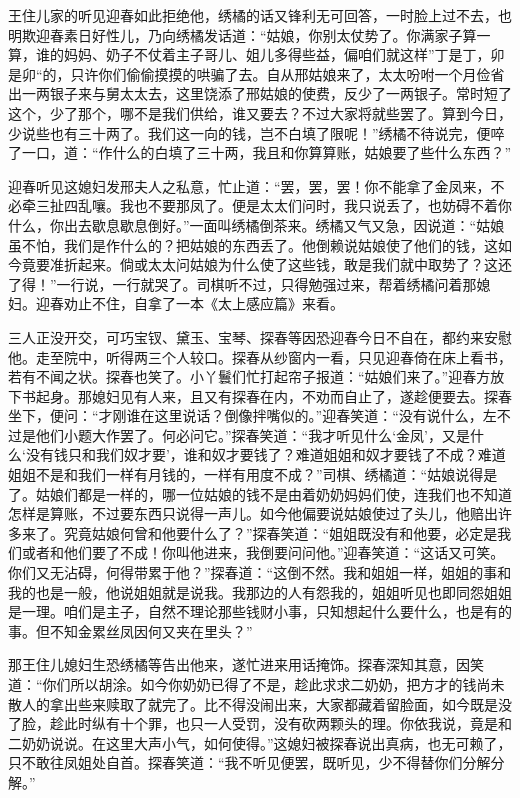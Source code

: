 \documentclass[12pt,oneside]{book}
\begin{document}
王住儿家的听见迎春如此拒绝他，绣橘的话又锋利无可回答，一时脸上过不去，也明欺迎春素日好性儿，乃向绣橘发话道：“姑娘，你别太仗势了。你满家子算一算，谁的妈妈、奶子不仗着主子哥儿、姐儿多得些益，偏咱们就这样”丁是丁，卯是卯“的，只许你们偷偷摸摸的哄骗了去。自从邢姑娘来了，太太吩咐一个月俭省出一两银子来与舅太太去，这里饶添了邢姑娘的使费，反少了一两银子。常时短了这个，少了那个，哪不是我们供给，谁又要去？不过大家将就些罢了。算到今日，少说些也有三十两了。我们这一向的钱，岂不白填了限呢！”绣橘不待说完，便啐了一口，道：“作什么的白填了三十两，我且和你算算账，姑娘要了些什么东西？”

迎春听见这媳妇发邢夫人之私意，忙止道：“罢，罢，罢！你不能拿了金凤来，不必牵三扯四乱嚷。我也不要那凤了。便是太太们问时，我只说丢了，也妨碍不着你什么，你出去歇息歇息倒好。”一面叫绣橘倒茶来。绣橘又气又急，因说道：“姑娘虽不怕，我们是作什么的？把姑娘的东西丢了。他倒赖说姑娘使了他们的钱，这如今竟要准折起来。倘或太太问姑娘为什么使了这些钱，敢是我们就中取势了？这还了得！”一行说，一行就哭了。司棋听不过，只得勉强过来，帮着绣橘问着那媳妇。迎春劝止不住，自拿了一本《太上感应篇》来看。

三人正没开交，可巧宝钗、黛玉、宝琴、探春等因恐迎春今日不自在，都约来安慰他。走至院中，听得两三个人较口。探春从纱窗内一看，只见迎春倚在床上看书，若有不闻之状。探春也笑了。小丫鬟们忙打起帘子报道：“姑娘们来了。”迎春方放下书起身。那媳妇见有人来，且又有探春在内，不劝而自止了，遂趁便要去。探春坐下，便问：“才刚谁在这里说话？倒像拌嘴似的。”迎春笑道：“没有说什么，左不过是他们小题大作罢了。何必问它。”探春笑道：“我才听见什么‘金凤’，又是什么‘没有钱只和我们奴才要’，谁和奴才要钱了？难道姐姐和奴才要钱了不成？难道姐姐不是和我们一样有月钱的，一样有用度不成？”司棋、绣橘道：“姑娘说得是了。姑娘们都是一样的，哪一位姑娘的钱不是由着奶奶妈妈们使，连我们也不知道怎样是算账，不过要东西只说得一声儿。如今他偏要说姑娘使过了头儿，他赔出许多来了。究竟姑娘何曾和他要什么了？”探春笑道：“姐姐既没有和他要，必定是我们或者和他们要了不成！你叫他进来，我倒要问问他。”迎春笑道：“这话又可笑。你们又无沾碍，何得带累于他？”探春道：“这倒不然。我和姐姐一样，姐姐的事和我的也是一般，他说姐姐就是说我。我那边的人有怨我的，姐姐听见也即同怨姐姐是一理。咱们是主子，自然不理论那些钱财小事，只知想起什么要什么，也是有的事。但不知金累丝凤因何又夹在里头？”

那王住儿媳妇生恐绣橘等告出他来，遂忙进来用话掩饰。探春深知其意，因笑道：“你们所以胡涂。如今你奶奶已得了不是，趁此求求二奶奶，把方才的钱尚未散人的拿出些来赎取了就完了。比不得没闹出来，大家都藏着留脸面，如今既是没了脸，趁此时纵有十个罪，也只一人受罚，没有砍两颗头的理。你依我说，竟是和二奶奶说说。在这里大声小气，如何使得。”这媳妇被探春说出真病，也无可赖了，只不敢往凤姐处自首。探春笑道：“我不听见便罢，既听见，少不得替你们分解分解。”
\end{document}
